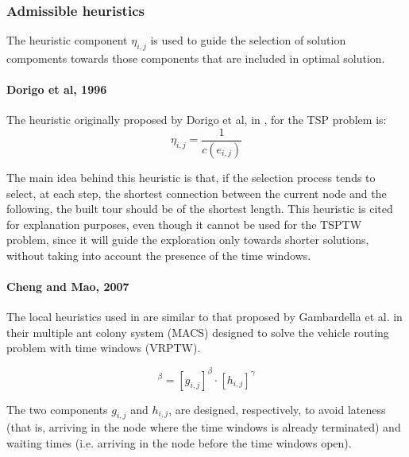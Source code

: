 \begin{homeworkProblem}
\subsubsection{Admissible heuristics}
The heuristic component $\eta_{i,j}$ is used to guide the selection of solution compoments towards those components that are included in optimal solution.

\paragraph{Dorigo et al, 1996}
The heuristic originally proposed by Dorigo et al, in \cite{dorigo1996ant}, for the TSP problem is:
\begin{equation}
  \eta_{i,j} = \frac{1}{c(e_{i,j})}
\end{equation}

The main idea behind this heuristic is that, if the selection process tends to select, at each step, the shortest connection between the current node and the following, the built tour should be of the shortest length.
This heuristic is cited for explanation purposes, even though it cannot be used for the TSPTW problem, since it will guide the exploration only towards shorter solutions, without taking into account the presence of the time windows.

\paragraph{Cheng and Mao, 2007}
The local heuristics used in \cite{cheng2007modified} are similar to that proposed by Gambardella et al. \cite{gambardella1999macs} in their multiple ant colony system (MACS) designed to solve the vehicle routing problem with time windows (VRPTW).

\begin{equation}
[\eta_{i,j}]^\beta = [g_{i,j}]^\beta \cdot [h_{i,j}]^\gamma
\end{equation}  

The two components $g_{i,j}$ and $h_{i,j}$, are designed, respectively, to avoid lateness (that is, arriving in the node where the time windows is already terminated) and waiting times (i.e. arriving in the node before the time windows open).


\end{homeworkProblem}
